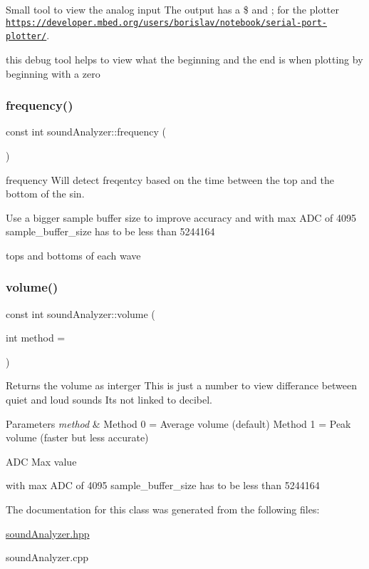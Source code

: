 Small tool to view the analog input The output has a \$ and ; for the plotter \href{https://developer.mbed.org/users/borislav/notebook/serial-port-plotter/}{\tt https\+://developer.\+mbed.\+org/users/borislav/notebook/serial-\/port-\/plotter/}. 

this debug tool helps to view what the beginning and the end is when plotting by beginning with a zero \mbox{\label{classsound_analyzer_aed5b8c463c0b7a386c619e36aa758427}} 
\subsubsection{\texorpdfstring{frequency()}{frequency()}}
{\footnotesize\ttfamily const int sound\+Analyzer\+::frequency (\begin{DoxyParamCaption}{ }\end{DoxyParamCaption})}



frequency Will detect freqentcy based on the time between the top and the bottom of the sin. 

Use a bigger sample buffer size to improve accuracy and with max A\+DC of 4095 sample\+\_\+buffer\+\_\+size has to be less than 5244164

tops and bottoms of each wave \mbox{\label{classsound_analyzer_af0a99b0fa68b2c1462240d0543a79a81}} 
\subsubsection{\texorpdfstring{volume()}{volume()}}
{\footnotesize\ttfamily const int sound\+Analyzer\+::volume (\begin{DoxyParamCaption}\item[{int}]{method = {} }\end{DoxyParamCaption})}



Returns the volume as interger This is just a number to view differance between quiet and loud sounds It\textquotesingle{}s not linked to decibel. 


\begin{DoxyParams}{Parameters}
{\em method} & Method 0 = Average volume (default) Method 1 = Peak volume (faster but less accurate) \\
\hline
\end{DoxyParams}
A\+DC Max value

with max A\+DC of 4095 sample\+\_\+buffer\+\_\+size has to be less than 5244164 

The documentation for this class was generated from the following files\+:\begin{DoxyCompactItemize}
\item 
\hyperlink{sound_analyzer_8hpp}{sound\+Analyzer.\+hpp}\item 
sound\+Analyzer.\+cpp\end{DoxyCompactItemize}
